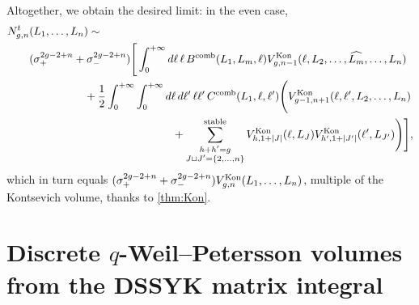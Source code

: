 \documentclass[a4paper,11pt,english]{article}
\theoremstyle{plain}
\theoremstyle{definition}
\theoremstyle{plain}
\begin{document}
Altogether, we obtain the desired limit: in the even case,
\begin{equation}
\begin{split}
    N_{g,n}^{t}&(L_1,\ldots,L_n)
    \sim \\
    &
    (\sigma_+^{2g-2+n} + \sigma_-^{2g-2+n})
    \Bigg[
    \int_{0}^{+\infty}
        d\ell \,
          \ell \, B^{\textup{comb}}(L_1,L_m,\ell)
          V_{g,n-1}^{\textup{Kon}}(\ell,L_2,\dots, \widehat{L_m},\dots, L_n) \\
    & \qquad\qquad\quad
    + \frac{1}{2} \int_{0}^{+\infty} \int_{0}^{+\infty}
        d\ell \, d\ell' \,
        \ell \ell' \, C^{\textup{comb}}(L_1,\ell,\ell') \Bigg(
            V_{g-1,n+1}^{\textup{Kon}}(\ell,\ell',L_2,\dots,L_n) \\
    & \qquad\qquad\qquad\qquad\qquad\qquad\quad
            +
            \sum_{\substack{ h + h' = g \\ J \sqcup J' = \{2,\dots,n\} }}^{\textup{stable}}
                V_{h,1+|J|}^{\textup{Kon}}(\ell,L_{J})
                V_{h',1+|J'|}^{\textup{Kon}}(\ell',L_{J'})
    \Bigg)
    \Bigg],
\end{split}
\end{equation}
which in turn equals $(\sigma_+^{2g-2+n} + \sigma_-^{2g-2+n})V_{g,n}^{\textup{Kon}}(L_1,\ldots,L_n)$, multiple of the Kontsevich volume, thanks to \cref{thm:Kon}.

\section{Discrete \texorpdfstring{$q$}{q}-Weil--Petersson volumes from the DSSYK matrix integral}
\label{sec:DSSYK:rec}
\end{document}
